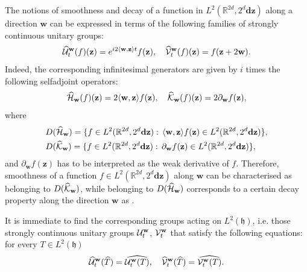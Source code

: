 \documentclass[preprint]{elsarticle}
\theoremstyle{definition}
\def\hh{\mathfrak{h} }
\def\RR{\mathbb{R}}
\def\hh{\mathfrak{h}}
\begin{document}
The notions of smoothness and decay of a function in $L^2(\RR^{2d},2^{d}\mathbf{dz})$ along a direction $\mathbf{w}$ can be expressed in terms of the following families of strongly continuous unitary groups:
$$\widehat{{\cal U}}^{\mathbf{w}}_t(f)(\mathbf{z})=e^{i2\langle \mathbf{w},\mathbf{z} \rangle t}f(\mathbf{z}), \quad \widehat{{\cal V}}^{\mathbf{w}}_t(f)(\mathbf{z})=f(\mathbf{z}+ 2\mathbf{w}).
$$
Indeed, the corresponding infinitesimal generators are given by $i$ times the following selfadjoint operators:
$$\widehat{{\cal H}}_{\mathbf{w}}(f)(\mathbf{z})=2\langle \mathbf{w}, \mathbf{z} \rangle f(\mathbf{z}), \quad  \widehat{{\cal K}}_{\mathbf{w}}(f)(\mathbf{z})=2\partial_{\mathbf{w}}f(\mathbf{z}),$$
where
\begin{align} 
&D(\widehat{{\cal H}}_{\mathbf{w}})=\{f \in L^2(\RR^{2d},2^{d}\mathbf{dz}):\,\langle \mathbf{w}, \mathbf{z} \rangle f(\mathbf{z}) \in L^2(\RR^{2d},2^{d}\mathbf{dz})\},\label{eq:domainHhat}\\
&D(\widehat{{\cal K}}_{\mathbf{w}})=\{f \in L^2(\RR^{2d},2^{d}\mathbf{dz}):\,\partial_{\mathbf{w}}f(\mathbf{z}) \in L^2(\RR^{2d},2^{d}\mathbf{dz})\},
\end{align}
and $\partial_{\mathbf{w}}f(\mathbf{z})$ has to be interpreted as the weak derivative of $f$. Therefore, smoothness of a function $f \in L^2(\RR^{2d},2^{d}\mathbf{dz})$ along $\mathbf{w}$ can be characterised as belonging to $D(\widehat{{\cal K}}_{\mathbf{w}})$, while belonging to $D(\widehat{{\cal H}}_{\mathbf{w}})$ corresponds to a certain decay property along the direction $\mathbf{w}$ as .

It is immediate to find the corresponding groups acting on $L^2(\hh)$, i.e. those strongly continuous unitary groups ${\cal U}^{\mathbf{w}}_t$, ${\cal V}^{\mathbf{w}}_t$ that satisfy the following equations: for every $T \in L^2(\hh)$
\begin{equation} \label{eq:equivalenceofgroups}\widehat{{\cal U}}^{\mathbf{w}}_t (\widehat{T})=\widehat{{\cal U}^{\mathbf{w}}_t(T)}, \quad \widehat{{\cal V}}^{\mathbf{w}}_t (\widehat{T})=\widehat{{\cal V}^{\mathbf{w}}_t(T)}.\end{equation}
\end{document}
